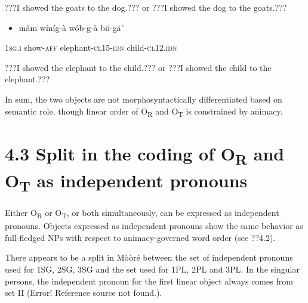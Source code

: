 \documentclass[output=paper]{langsci/langscibook}
\begin{document}
{{\begin{styleTranslation}
???I showed the goats to the dog.??? or ???I showed the dog to the goats.???  
\end{styleTranslation}

\begin{itemize}
\item \begin{styleNumberedEX}
\label{bkm:Ref424143137}m\`{a}m    w\'{i}n\'{i}g-\`{a}    w\'{o}b-g-\`{a}    bii-g\~{a}\`{ }
\end{styleNumberedEX}\end{itemize}
\begin{styleGloss}
\textsc{1sg.i  }  show-\textsc{aff}    elephant-\textsc{cl15-idn}  child-\textsc{cl12.idn}
\end{styleGloss}

\begin{styleTranslation}
???I showed the elephant to the child.??? or ???I showed the child to the elephant.???
\end{styleTranslation}

In sum, the two objects are not morphosyntactically differentiated based on semantic role, though linear order of O\textsubscript{R} and O\textsubscript{T }is constrained by animacy.

\section{4.3 Split in the coding of O\textsubscript{R} and O\textsubscript{T} as independent pronouns}

Either O\textsubscript{R} or O\textsubscript{T}, or both simultaneously, can be expressed as independent pronouns. Objects expressed as independent pronouns show the same behavior as full-fledged NPs with respect to animacy-governed word order (see ??4.2). 

There appears to be a split in M\`{o}\`{o}r\'{e} between the set of independent pronouns used for 1SG, 2SG, 3SG and the set used for 1PL, 2PL and 3PL. In the singular persons, the independent pronoun for the first linear object always comes from set II (Error! Reference source not found.). 

}}
\end{document}
